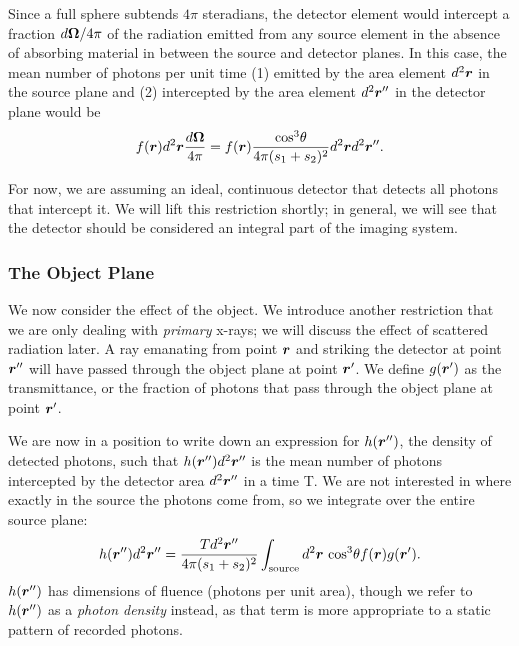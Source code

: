 \documentclass[mphy386-notes.tex]{subfiles}
\begin{document}
Since a full sphere subtends $4\pi$ steradians, the detector element would
intercept a fraction $d\boldsymbol{\Omega}/4\pi$ of the radiation emitted from
any source element in the absence of absorbing material in between
the source and detector planes. In this case, the mean number of
photons per unit time (1) emitted by the area element $d^2\boldsymbol{r}$ in the source
plane and (2) intercepted by the area element $d^2\boldsymbol{r}''$ in the detector
plane would be
\begin{align}
  f(\boldsymbol{r})d^2\boldsymbol{r}\frac{d\boldsymbol{\Omega}}{4\pi} = f(\boldsymbol{r})\frac{\text{cos}^3\theta}{4\pi(s_1+s_2)^2}d^2\boldsymbol{r}d^2\boldsymbol{r}''.
\end{align}

For now, we are assuming an ideal, continuous detector that detects all photons
that intercept it. We will lift this restriction shortly; in general, we will
see that the detector should be considered an integral part of the imaging
system.

\subsubsection{The Object Plane}

We now consider the effect of the object. We introduce another restriction
that we are only dealing with \textit{primary} x-rays; we will discuss the
effect of scattered radiation later. A ray emanating from point $\boldsymbol{r}$ and
striking the detector at point $\boldsymbol{r}''$ will have passed through the object
plane at point $\boldsymbol{r}'$. We define $g(\boldsymbol{r}')$ as the transmittance, or the
fraction of photons that pass through the object plane at point $\boldsymbol{r}'$.

We are now in a position to write down an expression for $h(\boldsymbol{r}'')$, the
density of detected photons, such that $h(\boldsymbol{r}'')d^2\boldsymbol{r}''$ is the mean
number of photons intercepted by the detector area $d^2\boldsymbol{r}''$ in a time T.
We are not interested in where exactly in the source the photons come from,
so we integrate over the entire source plane:
\begin{align}
  h(\boldsymbol{r}'')d^2\boldsymbol{r}'' = \frac{Td^2\boldsymbol{r}''}{4\pi(s_1 + s_2)^2}\int_{\text{source}}d^2\boldsymbol{r} \text{ cos}^3\theta f(\boldsymbol{r})g(\boldsymbol{r}').
  \label{eq:h1}
\end{align}
$h(\boldsymbol{r}'')$ has dimensions of fluence (photons per unit area), though
we refer to $h(\boldsymbol{r}'')$ as a \textit{photon density} instead, as that
term is more appropriate to a static pattern of recorded photons.
\end{document}
